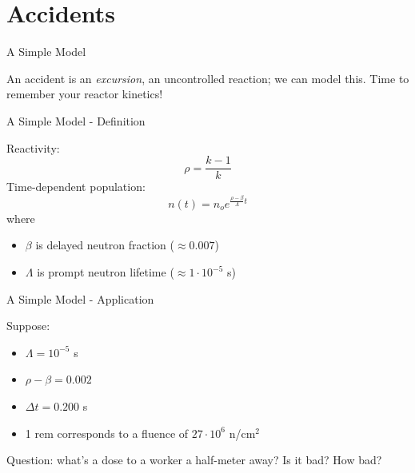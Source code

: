 \documentclass[10pt]{beamer}
\begin{document}
\section{Accidents}

\begin{frame}[fragile]{A Simple Model}

An accident is an {\it excursion}, an uncontrolled reaction; we can
model this.
\vfill
Time to remember your reactor kinetics!
\end{frame}

\begin{frame}[fragile]{A Simple Model - Definition}

Reactivity:
\begin{equation}
 \rho = \frac{k-1}{k} 
\end{equation}
Time-dependent population:
\begin{equation}
  n(t) =  n_o e^{\frac{\rho-\beta}{\Lambda}t}
\end{equation}
where
\begin{itemize}
 \item $\beta$ is delayed neutron fraction ($\approx 0.007$)
 \item $\Lambda$ is prompt neutron lifetime ($\approx 1\cdot 10^{-5}$ s)
\end{itemize}

\end{frame}

\begin{frame}[fragile]{A Simple Model - Application}

Suppose:
\begin{itemize}
 \item $\Lambda = 10^{-5}$ s
 \item $\rho-\beta = 0.002$
 \item $\Delta t = 0.200$ s
 \item 1 rem corresponds to a fluence of  $27\cdot 10^6$  n/cm$^2$
\end{itemize}
\vfill
\textcolor{mitred}{Question}: what's a dose to a worker a half-meter away?
  Is it bad? How bad?

\end{frame}
\end{document}
